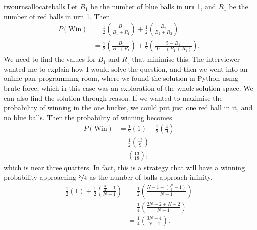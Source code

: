\begin{answer}{twournsallocateballs}
Let $B_1$ be the number of blue balls in urn 1, and
$R_1$ be the number of red balls in urn 1.
Then
\begin{equation}
\label{eq:urns:crux}
\begin{aligned}
 P(\text{Win})
 &=
  \frac{1}{2}
  \left(
  \frac{B_1}{B_1 + R_1}
  \right)
  +
  \frac{1}{2}
  \left(
  \frac{B_2}{B_2 + R_2}
  \right)
  \\
 &=
  \frac{1}{2}
  \left(
  \frac{B_1}{B_1 + R_1}
  \right)
  +
  \frac{1}{2}
  \left(
  \frac{5 - B_1}{10 - (B_1 +R_1)}
  \right)
  \text{.}
\end{aligned}
\end{equation}
We need to find the values for $B_1$ and $R_1$ that minimise this.
The interviewer wanted me to explain how I would solve the question, and then we went into an online pair-programming room, where we found the solution in Python using brute force, which in this case was an exploration of the whole solution space.
We can also find the solution through reason.
If we wanted to maximise the probability of winning in the one bucket, we could put just one red ball in it, and no blue balls.
Then the probability of winning becomes
\begin{equation*}
\begin{aligned}
 P(\text{Win})
 &=
  \frac{1}{2}
  \left(
  1
  \right)
  +
  \frac{1}{2}
  \left(
  \frac{4}{9}
  \right)
  \\
 &=
  \frac{1}{2}
  \left(
  \frac{13}{9}
  \right)
  \\
 &=
  \left(
  \frac{13}{18}
  \right)
  \text{,}
\end{aligned}
\end{equation*}
which is near three quarters. In fact, this is a strategy that will have a winning probability approaching $\nicefrac{3}{4}$ as the number of balls approach infinity.
\begin{align*}
  \frac{1}{2}
  \left(
  1
  \right)
  +
  \frac{1}{2}
  \left(
  \frac{\frac{N}{2} - 1}{N - 1}
  \right)
  &=
  \frac{1}{2}
  \left(
  \frac{ N-1 + \left( \frac{N}{2} - 1 \right) }{N - 1}
  \right)
  \\
  &=
  \frac{1}{4}
  \left(
  \frac{ 2N-2 +  N - 2  }{N - 1}
  \right)
  \\
  &=
  \frac{1}{4}
  \left(
  \frac{ 3N - 4  }{N - 1}
  \right)
  \text{.}
\end{align*}


\end{answer}
